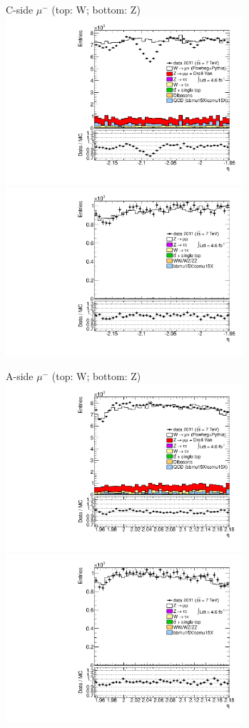 {{\cole
}

 {
\colb[T]

C-side $\mu^{-}$ (top: W; bottom: Z)
\centering
\includegraphics[width=0.66\textwidth]{dates/20130306/figures/etaphi/W_10_C_stack_l_eta_NEG} \\
\includegraphics[width=0.66\textwidth]{dates/20130306/figures/etaphi/Z_10_C_stack_lN_eta_ALL.pdf}

A-side $\mu^{-}$ (top: W; bottom: Z)
\centering
\includegraphics[width=0.66\textwidth]{dates/20130306/figures/etaphi/W_10_A_stack_l_eta_NEG} \\
\includegraphics[width=0.66\textwidth]{dates/20130306/figures/etaphi/Z_10_A_stack_lN_eta_ALL.pdf} 

}}
